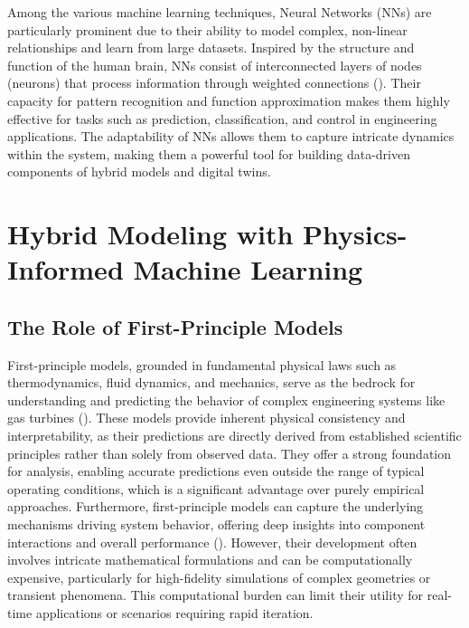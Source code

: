 \documentclass[
  12pt,
  oneside,
  a4paper,
  english,
  brazil]{abntex2}
\begin{document}
Among the various machine learning techniques, Neural Networks (NNs) are
particularly prominent due to their ability to model complex, non-linear
relationships and learn from large datasets. Inspired by the structure
and function of the human brain, NNs consist of interconnected layers of
nodes (neurons) that process information through weighted connections
(). Their capacity for pattern recognition and function
approximation makes them highly effective for tasks such as prediction,
classification, and control in engineering applications. The
adaptability of NNs allows them to capture intricate dynamics within the
system, making them a powerful tool for building data-driven components
of hybrid models and digital twins.

\section{\texorpdfstring{\textbf{Hybrid Modeling with Physics-Informed Machine Learning}}{}}\label{section-4}

\subsection{The Role of First-Principle
Models}\label{the-role-of-first-principle-models}

First-principle models, grounded in fundamental physical laws such as
thermodynamics, fluid dynamics, and mechanics, serve as the bedrock for
understanding and predicting the behavior of complex engineering systems
like gas turbines (). These models provide inherent physical consistency and
interpretability, as their predictions are directly derived from
established scientific principles rather than solely from observed data.
They offer a strong foundation for analysis, enabling accurate
predictions even outside the range of typical operating conditions,
which is a significant advantage over purely empirical approaches.
Furthermore, first-principle models can capture the underlying
mechanisms driving system behavior, offering deep insights into
component interactions and overall performance
(). However, their
development often involves intricate mathematical formulations and can
be computationally expensive, particularly for high-fidelity simulations
of complex geometries or transient phenomena. This computational burden
can limit their utility for real-time applications or scenarios
requiring rapid iteration.
\end{document}
